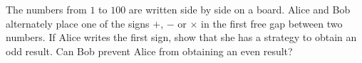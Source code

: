 The numbers from $1$ to $100$ are written side by side on a board. Alice and Bob alternately place one of the signs $+$, $-$ or $\times$ in the first free gap between two numbers. If Alice writes the first sign, show that she has a strategy to obtain an odd result. Can Bob prevent Alice from obtaining an even result?

